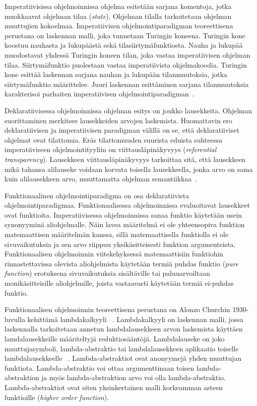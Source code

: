Imperatiivisissa ohjelmoinnissa ohjelma esitetään sarjana komentoja, jotka muokkaavat ohjelman tilaa (\textit{state}). Ohjelman tilalla tarkoitetaan ohjelman muuttujien kokoelmaa. Imperatiivisen ohjelmointiparadigman teoreettisena perustana on laskennan malli, joka tunnetaan Turingin koneena. Turingin kone koostuu nauhasta ja lukupäästä sekä tilasiirtymäfunktiosta. Nauha ja lukupää muodostavat yhdessä Turingin koneen tilan, joka vastaa imperatiivisen ohjelman tilaa. Siirtymäfunktio puolestaan vastaa imperatiivista ohjelmakoodia. Turingin kone esittää laskennan sarjana nauhan ja lukupään tilanmuutoksia, jotka siirtymäfunktio määrittelee. Juuri laskennan esittäminen sarjana tilanmuutoksia karakterisoi parhaiten imperatiivisen ohjelmointiparadigman~\cite[p.~3]{Hudak89}.
\par
Deklaratiivisessa ohjelmoinnissa ohjelman esitys on joukko lausekkeita. Ohjelman suorittaminen merkitsee lausekkeiden arvojen laskemista. Huomattavin ero deklaratiivisen ja imperatiivisen paradigman välillä on se, että deklaratiiviset ohjelmat ovat tilattomia. Eräs tilattomuuden suurista eduista suhteessa imperatiiviseen ohjelmointityyliin on viittausläpinäkyvyys (\textit{referential transparency}). Lausekkeen viittausläpinäkyvyys tarkoittaa sitä, että lausekkeen mikä tahansa alilauseke voidaan korvata toisella lausekkeella, jonka arvo on sama kuin alilausekkeen arvo, muuttamatta ohjelman semantiikkaa~\cite[p.~5]{Hudak89}.
\par
Funktionaalinen ohjelmointiparadigma on osa deklaratiivista ohjelmointiparadigmaa. Funktionaalisessa ohjelmoinnissa evaluoitavat lausekkeet ovat funktioita. Imperatiivisessa ohjelmoinnissa sanaa funktio käytetään usein synonyyminä aliohjelmalle. Näin lavea määritelmä ei ole yhteensopiva funktion matemaattisen määritelmän kanssa, sillä matemaattisella funktiolla ei ole sivuvaikutuksia ja sen arvo riippuu yksikäsitteisesti funktion argumenteista. Funktionaalisen ohjelmoinnin viitekehyksessä matemaattisiin funktiohin rinnastettavissa olevista aliohjelmista käytetään termiä puhdas funktio (\textit{pure function}) erotuksena sivuvaikutuksia sisältäville tai paluuarvoiltaan monikäsitteisille aliohjelmille, joista vastaavasti käytetään termiä ei-puhdas funktio.  
\par
Funktionaalisen ohjelmoinnin teoreettisena perustana on Alonzo Churchin 1930-luvulla kehittämä lambdakalkyyli ~\cite[p.~37--50]{PJ1987}. Lambdakalkyyli on laskennan malli, jossa laskennalla tarkoitetaan annetun lambdalausekkeen arvon laskemista käyttäen lamdalausekkeille määriteltyjä reduktiosääntöjä. Lambdalauseke on joko muuttujasymboli, lambda-abstraktio tai lambdalausekkeen aplikaatio toiselle lambdalausekkeelle ~\cite[p.~9--36]{PJ1987}. Lambda-abstraktiot ovat anonyymejä yhden muuttujan funktiota. Lambda-abstraktio voi ottaa argumenttinaan toisen lambda-abstraktion ja myös lambda-abstraktion arvo voi olla lambda-abstraktio. Lambda-abstraktiot ovat siten yksinkertainen malli korkeamman asteen funktioille (\textit{higher order function}).
